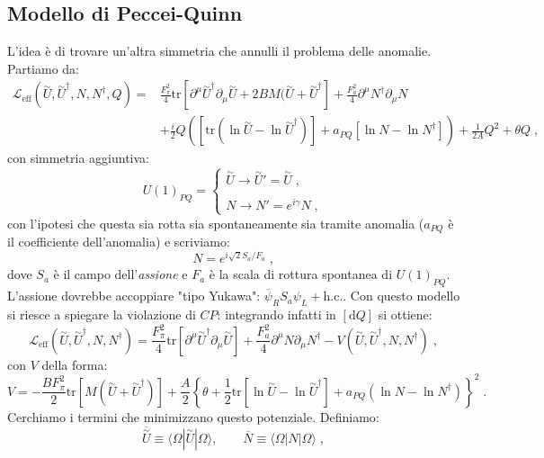 \documentclass[12pt,a4paper]{article}
\theoremstyle{definition}
\newcommand{\lag}{\mathcal{L}}
\newcommand{\diff}[1][]{\mathrm{d}#1}
\newcommand{\bra}{\langle}
\newcommand{\ket}{\rangle}
\newcommand{\adj}[1]{#1^{\dagger}}
\newcommand{\tr}{\mathrm{tr}}
\numberwithin{equation}{section}
\begin{document}
\subsection{Modello di Peccei-Quinn}
L'idea è di trovare un'altra simmetria che annulli il problema delle anomalie. Partiamo da:
\begin{align*}
\lag_{\mathrm{eff}}(\stackrel{\sim}{U},\adj{\stackrel{\sim}{U}},N,\adj{N},Q) =&\frac{F_{\pi}^2}{4}\tr[\partial^{\mu}\adj{\stackrel{\sim}{U}}\partial_{\mu}\stackrel{\sim}{U}+2BM(\stackrel{\sim}{U}+\adj{\stackrel{\sim}{U}}]+\frac{F_a^2}{4}\partial^{\mu}\adj{N}\partial_{\mu}N \\
&+\frac{i}{2}Q\left([\tr(\ln\stackrel{\sim}{U}-\ln\adj{\stackrel{\sim}{U}})]+a_{PQ}[\ln N-\ln\adj{N}]\right)+\frac{1}{2A}Q^2+\theta Q\;,
\end{align*}
con simmetria aggiuntiva:
\begin{equation}
U(1)_{PQ}=\begin{cases}
\stackrel{\sim}{U}\to\stackrel{\sim}{U}'=\stackrel{\sim}{U}\;, \\
\\
N\to N'=e^{i\gamma}N\;,
\end{cases}
\end{equation}
con l'ipotesi che questa sia rotta sia spontaneamente sia tramite anomalia ($a_{PQ}$ è il coefficiente dell'anomalia) e scriviamo:
$$
N=e^{i\sqrt{2}S_a/F_{a}}\;,
$$
dove $S_a$ è il campo dell'\emph{assione} e $F_{a}$ è la scala di rottura spontanea di $U(1)_{PQ}$. L'assione dovrebbe accoppiare "tipo Yukawa": $\overline{\psi}_RS_a\psi_L+\mathrm{h.c.}$. Con questo modello si riesce a spiegare la violazione di $CP$: integrando infatti in $[\diff{Q}]$ si ottiene:
\begin{equation}
\lag_{\mathrm{eff}}(\stackrel{\sim}{U},\adj{\stackrel{\sim}{U}},N,\adj{N})=\frac{F_{\pi}^2}{4}\tr[\partial^{\mu}\adj{\stackrel{\sim}{U}}\partial_{\mu}\stackrel{\sim}{U}]+\frac{F_a^2}{4}\partial^{\mu}N\partial_{\mu}\adj{N}-V(\stackrel{\sim}{U},\adj{\stackrel{\sim}{U}},N,\adj{N})\;,
\end{equation}
con $V$ della forma:
\begin{equation}
V=-\frac{BF_{\pi}^2}{2}\tr[M(\stackrel{\sim}{U}+\adj{\stackrel{\sim}{U}})]+\frac{A}{2}\left\{\theta+\frac{1}{2}\tr[\ln\stackrel{\sim}{U}-\ln\adj{\stackrel{\sim}{U}}]+a_{PQ}(\ln N-\ln\adj{N})\right\}^2\;.
\end{equation}
Cerchiamo i termini che minimizzano questo potenziale. Definiamo:
$$
\overline{\stackrel{\sim}{U}}\equiv\bra\Omega|\stackrel{\sim}{U}|\Omega\ket,\qquad \overline{N}\equiv\bra\Omega|N|\Omega\ket\;,
$$
\end{document}
